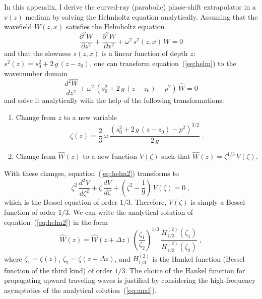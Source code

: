 In this appendix, I derive the curved-ray (parabolic) phase-shift extrapolator
in a $v(z)$ medium by solving the Helmholtz equation analytically. Assuming
that the wavefield $W(z,x)$ satisfies the Helmholtz equation
\begin{equation}
  \label{eq:helm}
  \frac{\partial^2 W}{\partial z^2} +
  \frac{\partial^2 W}{\partial x^2} +
  \omega^2\,s^2(z,x)\,W = 0
\end{equation}
and that the slowness $s(z,x)$ is a linear function of depth $z$: $s^2(z) =
s_0^2 + 2\,g\,(z-z_0)$, one can transform equation~(\ref{eq:helm}) 
to the wavenumber domain
\begin{equation}
  \label{eq:helm2}
  \frac{d^2 \widehat{W}}{d z^2} + 
  \omega^2\,\left(s_0^2 + 2\,g\,(z-z_0)  - p^2\right)\,
  \widehat{W} = 0
\end{equation}
and solve it analytically with the help of the following transformations:
\begin{enumerate}
\item Change from $z$ to a new variable
  \begin{equation}
    \label{eq:z2}
    \zeta(z) = \frac{2}{3}\,\omega\,
    \frac{
      \left(s_0^2 + 2\,g\,(z-z_0)  - p^2\right)^{3/2}}
    {2\,g}\;.
  \end{equation}
\item Change from $\widehat{W}(z)$ to a new function 
  $V(\zeta)$ such that $\widehat{W}(z) = \zeta^{1/3}\,V(\zeta)$.
\end{enumerate}
With these changes, equation~(\ref{eq:helm2}) transforms to
\begin{equation}
  \label{eq:bessel}
  \zeta^2\,\frac{d^2 V}{d \zeta^2} + 
  \zeta\,\frac{d V}{d \zeta} + 
  \left(\zeta^2-\frac{1}{9}\right)\,V(\zeta) = 0\;,
\end{equation}
which is the Bessel equation of order $1/3$. 
Therefore, $V(\zeta)$ is simply a Bessel function of order $1/3$. 
We can write the analytical solution of equation~(\ref{eq:helm2}) in the form
\begin{equation}
  \label{eq:anal}
  \widehat{W}(z) = \widehat{W}(z+\Delta z)\,\left(\frac{\zeta_1}{\zeta_2}\right)^{1/3}\,
  \frac{H_{1/3}^{(2)}(\zeta_1)}{H_{1/3}^{(2)}(\zeta_2)}\;,
\end{equation}
where $\zeta_1 = \zeta(z)$, $\zeta_2 = \zeta(z+\Delta z)$, and $H_{1/3}^{(2)}$
is the Hankel function (Bessel function of the third kind) of order $1/3$. The
choice of the Hankel function for propagating upward traveling waves is
justified by considering the high-frequency asymptotics of the analytical
solution~(\ref{eq:anal}).

